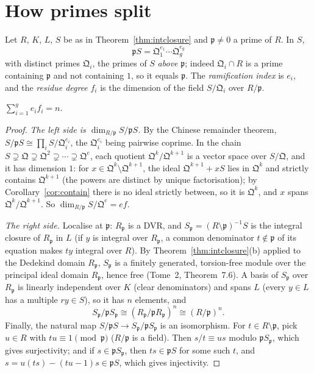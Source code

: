 \section{How primes split}

Let $R$, $K$, $L$, $S$ be as in Theorem~\ref{thm:intclosure} and $\mathfrak p\ne0$ a prime of $R$. In $S$,
\[
\mathfrak pS=\mathfrak Q_1^{e_1}\cdots\mathfrak Q_g^{e_g}
\]
with distinct primes $\mathfrak Q_i$, the primes of $S$ \emph{above} $\mathfrak p$; indeed $\mathfrak Q_i\cap R$ is a prime containing $\mathfrak p$ and not containing $1$, so it equals $\mathfrak p$. The \emph{ramification index} is $e_i$, and
the \emph{residue degree} $f_i$ is the dimension of the field $S/\mathfrak Q_i$ over $R/\mathfrak p$.

\begin{theorem}\label{thm:fundid}
$\displaystyle\sum_{i=1}^ge_if_i=n$.
\end{theorem}

\begin{proof}
\emph{The left side is $\dim_{R/\mathfrak p}S/\mathfrak pS$.} By the Chinese remainder theorem, $S/\mathfrak pS\cong\prod_iS/\mathfrak Q_i^{e_i}$, the $\mathfrak Q_i^{e_i}$ being pairwise coprime. In the chain
$S\supsetneq\mathfrak Q\supsetneq\mathfrak Q^2\supsetneq\cdots\supsetneq\mathfrak Q^e$, each quotient $\mathfrak Q^k/\mathfrak Q^{k+1}$ is a vector space over $S/\mathfrak Q$, and it has dimension $1$: for $x\in\mathfrak Q^k\setminus\mathfrak Q^{k+1}$,
the ideal $\mathfrak Q^{k+1}+xS$ lies in $\mathfrak Q^k$ and strictly contains $\mathfrak Q^{k+1}$ (the powers are distinct by unique factorisation); by Corollary~\ref{cor:contain} there is no ideal strictly between, so it is $\mathfrak Q^k$, and $x$ spans $\mathfrak Q^k/\mathfrak Q^{k+1}$. So $\dim_{R/\mathfrak p}S/\mathfrak Q^e=ef$.

\emph{The right side.} Localise at $\mathfrak p$: $R_{\mathfrak p}$ is a DVR, and $S_{\mathfrak p}=(R\setminus\mathfrak p)^{-1}S$ is the integral closure of $R_{\mathfrak p}$ in $L$ (if $y$ is integral over $R_{\mathfrak p}$, a common denominator
$t\notin\mathfrak p$ of its equation makes $ty$ integral over $R$). By Theorem~\ref{thm:intclosure}(b) applied to the Dedekind domain $R_{\mathfrak p}$, $S_{\mathfrak p}$ is a finitely generated, torsion-free module over the
principal ideal domain $R_{\mathfrak p}$, hence free (Tome~2, Theorem~7.6). A basis of $S_{\mathfrak p}$ over $R_{\mathfrak p}$ is linearly independent over $K$ (clear denominators) and spans $L$ (every $y\in L$ has a multiple $ry\in S$),
so it has $n$ elements, and
\[
S_{\mathfrak p}/\mathfrak pS_{\mathfrak p}\cong(R_{\mathfrak p}/\mathfrak pR_{\mathfrak p})^n\cong(R/\mathfrak p)^n.
\]
Finally, the natural map $S/\mathfrak pS\to S_{\mathfrak p}/\mathfrak pS_{\mathfrak p}$ is an isomorphism. For $t\in R\setminus\mathfrak p$, pick $u\in R$ with $tu\equiv1\pmod{\mathfrak p}$ ($R/\mathfrak p$ is a field). Then $s/t\equiv us$
modulo $\mathfrak pS_{\mathfrak p}$, which gives surjectivity; and if $s\in\mathfrak pS_{\mathfrak p}$, then $ts\in\mathfrak pS$ for some such $t$, and $s=u(ts)-(tu-1)s\in\mathfrak pS$, which gives injectivity.
\end{proof}

